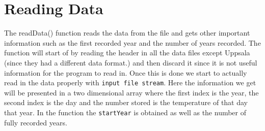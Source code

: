 
\section*{Reading Data}
The readData() function reads the data from the file and gets other important information such as the first recorded year and the number of years recorded. The function will start of by reading the header in all the data files except Uppsala (since they had a different data format.) and then discard it since it is not useful information for the program to read in.  Once this is done we start to actually read in the data properly with \texttt{input file stream}. Here the information we get will be presented in a two dimensional array where the first index is the year, the second index is the day and the number stored is the temperature of that day that year. In the function the \texttt{startYear} is obtained as well as the number of fully recorded years. 

